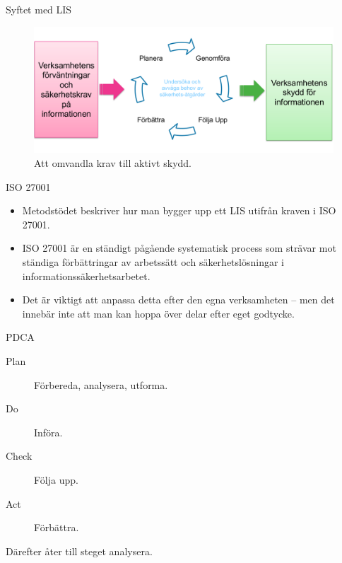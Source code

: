 \documentclass{beamer}
\begin{document}
\begin{frame}{Syftet med LIS}
  \begin{figure}
    \includegraphics[width=\textwidth]{infosak-pdca.png}
    \caption{Att omvandla krav till aktivt skydd.}
  \end{figure}
\end{frame}

\begin{frame}{ISO 27001}
  \begin{itemize}
    \item Metodstödet beskriver hur man bygger upp ett LIS utifrån kraven i ISO 
      27001.

    \item ISO 27001 är en ständigt pågående systematisk process som strävar mot 
      ständiga förbättringar av arbetssätt och säkerhetslösningar 
      i informationssäkerhetsarbetet.

    \item Det är viktigt att anpassa detta efter den egna verksamheten -- men 
      det innebär inte att man kan hoppa över delar efter eget godtycke.

  \end{itemize}
\end{frame}

\begin{frame}{PDCA}
  \begin{description}
    \item[Plan] Förbereda, analysera, utforma.
    \item[Do] Införa.
    \item[Check] Följa upp.
    \item[Act] Förbättra.
  \end{description}
  Därefter åter till steget analysera.
\end{frame}
\end{document}

